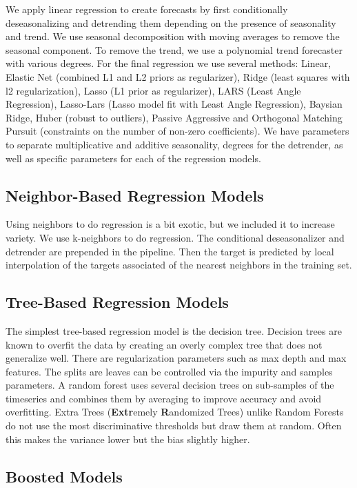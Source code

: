 We apply linear regression to create forecasts by first conditionally deseasonalizing and detrending them depending on the presence of seasonality and trend. We use seasonal decomposition with moving averages to remove the seasonal component. To remove the trend, we use a polynomial trend forecaster with various degrees. For the final regression we use several methods: Linear, Elastic Net (combined L1 and L2 priors as regularizer), Ridge (least squares with l2 regularization), Lasso (L1 prior as regularizer), LARS (Least Angle Regression), Lasso-Lars (Lasso model fit with Least Angle Regression), Baysian Ridge, Huber (robust to outliers), Passive Aggressive and Orthogonal Matching Pursuit (constraints on the number of non-zero coefficients). We have parameters to separate multiplicative and additive seasonality, degrees for the detrender, as well as specific parameters for each of the regression models.

\subsection{Neighbor-Based Regression Models}

Using neighbors to do regression is a bit exotic, but we included it to increase variety.
We use k-neighbors to do regression. The conditional deseasonalizer and detrender are prepended in the pipeline. Then the target is predicted by local interpolation of the targets associated of the nearest neighbors in the training set.

\subsection{Tree-Based Regression Models}

The simplest tree-based regression model is the decision tree. Decision trees are known to overfit the data by creating an overly complex tree that does not generalize well. There are regularization parameters such as max depth and max features. The splits are leaves can be controlled via the impurity and samples parameters. A random forest uses several decision trees on sub-samples of the timeseries and combines them by averaging to improve accuracy and avoid overfitting. Extra Trees (\textbf{Extr}emely \textbf{R}andomized Trees) unlike Random Forests do not use the most discriminative thresholds but draw them at random. Often this makes the variance lower but the bias slightly higher.

\subsection{Boosted Models}


